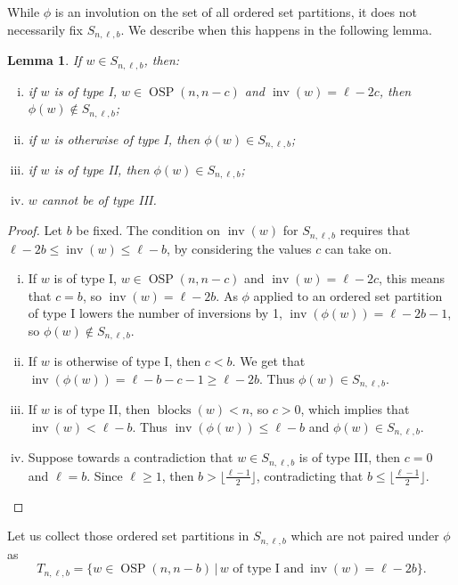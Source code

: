 \documentclass[11pt]{amsart}
\newtheorem{lemma}[theorem]{Lemma}
\theoremstyle{definition}
\newcommand{\0}{\emptyset}
\DeclareMathOperator{\OSP}{OSP}
\DeclareMathOperator{\inv}{inv}
\DeclareMathOperator{\blocks}{blocks}
\begin{document}
While $\phi$ is an involution on the set of all ordered set partitions, it does not necessarily fix $S_{n,\ell,b}$. 
We describe when this happens in the following lemma.
\begin{lemma}
    If $w \in S_{n,\ell,b}$, then:
\begin{enumerate}[(i)]
    \item if $w$ is of type I, $w \in \OSP(n,n-c)$ and $\inv(w) = \ell-2c$, then $\phi(w) \not\in S_{n,\ell,b}$;
    \item if $w$ is otherwise of type I, then $\phi(w) \in S_{n,\ell,b}$;
    \item if $w$ is of type II, then $\phi(w) \in S_{n,\ell,b}$;
    \item $w$ cannot be of type III.
\end{enumerate}
\end{lemma}

\begin{proof}
Let $b$ be fixed. The condition on $\inv(w)$ for $S_{n,\ell,b}$ requires that $\ell - 2b \leq \inv(w) \leq \ell-b$, by considering the values $c$ can take on.
\begin{enumerate}[(i)]
    \item If $w$ is of type I, $w \in \OSP(n,n-c)$ and $\inv(w) = \ell-2c$, this means that $c=b$, so $\inv(w) = \ell-2b$. As $\phi$ applied to an ordered set partition of type I lowers the number of inversions by 1, $\inv(\phi(w)) = \ell-2b-1$, so $\phi(w) \not \in S_{n,\ell,b}$.
    \item If $w$ is otherwise of type I, then $c < b$. We get that $\inv(\phi(w))= \ell - b - c -1 \geq \ell-2b$. Thus $\phi(w) \in S_{n,\ell,b}$.
    \item If $w$ is of type II, then $\blocks(w) < n$, so $c > 0$, which implies that $\inv(w) < \ell-b$. Thus $\inv(\phi(w)) \leq \ell - b$ and $\phi(w) \in S_{n,\ell,b}$.
    \item Suppose towards a contradiction that  $w \in S_{n,\ell,b}$ is of type III, then $c=0$ and $\ell = b$. Since $\ell \geq 1$, then $b > {\lfloor \frac{\ell-1}{2}\rfloor}$, contradicting that $b \leq {\lfloor \frac{\ell-1}{2}\rfloor}$.
\end{enumerate}
\end{proof}


Let us collect those ordered set partitions in $S_{n,\ell,b}$ which are not paired under $\phi$ as 
\begin{equation}
    T_{n,\ell,b}=
\{w\in \OSP(n,n-b) \, |\, \text{$w$ of type I and}\ \inv(w)=\ell-2b\}.
\end{equation}
\end{document}
